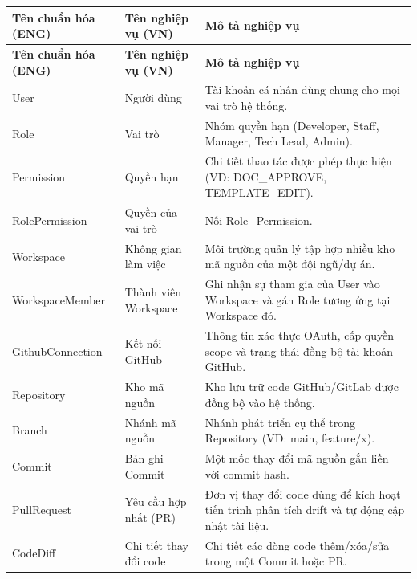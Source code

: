 \begin{longtable}{|p{}|p{}|p{}|}

\hline
\textbf{Tên chuẩn hóa (ENG)}
&
\textbf{Tên nghiệp vụ (VN)}
&
\textbf{Mô tả nghiệp vụ}
\\
\hline
\endfirsthead

\hline
\textbf{Tên chuẩn hóa (ENG)}
&
\textbf{Tên nghiệp vụ (VN)}
&
\textbf{Mô tả nghiệp vụ}
\\
\hline
\endhead

User
&
Người dùng
&
Tài khoản cá nhân dùng chung cho mọi vai trò hệ thống.
\\
\hline

Role
&
Vai trò
&
Nhóm quyền hạn (Developer, Staff, Manager, Tech Lead, Admin).
\\
\hline

Permission
&
Quyền hạn
&
Chi tiết thao tác được phép thực hiện (VD: DOC\_APPROVE, TEMPLATE\_EDIT).
\\
\hline
RolePermission & Quyền của vai trò & Nối Role\_Permission. \\
\hline
Workspace
&
Không gian làm việc
&
Môi trường quản lý tập hợp nhiều kho mã nguồn của một đội ngũ/dự án.
\\
\hline

WorkspaceMember
&
Thành viên Workspace
&
Ghi nhận sự tham gia của User vào Workspace và gán Role tương ứng tại Workspace đó.
\\
\hline

GithubConnection
&
Kết nối GitHub
&
Thông tin xác thực OAuth, cấp quyền scope và trạng thái đồng bộ tài khoản GitHub.
\\
\hline

Repository
&
Kho mã nguồn
&
Kho lưu trữ code GitHub/GitLab được đồng bộ vào hệ thống.
\\
\hline

Branch
&
Nhánh mã nguồn
&
Nhánh phát triển cụ thể trong Repository (VD: main, feature/x).
\\
\hline

Commit
&
Bản ghi Commit
&
Một mốc thay đổi mã nguồn gắn liền với commit hash.
\\
\hline

PullRequest
&
Yêu cầu hợp nhất (PR)
&
Đơn vị thay đổi code dùng để kích hoạt tiến trình phân tích drift và tự động cập nhật tài liệu.
\\
\hline

CodeDiff
&
Chi tiết thay đổi code
&
Chi tiết các dòng code thêm/xóa/sửa trong một Commit hoặc PR.
\\
\hline


\end{longtable}
